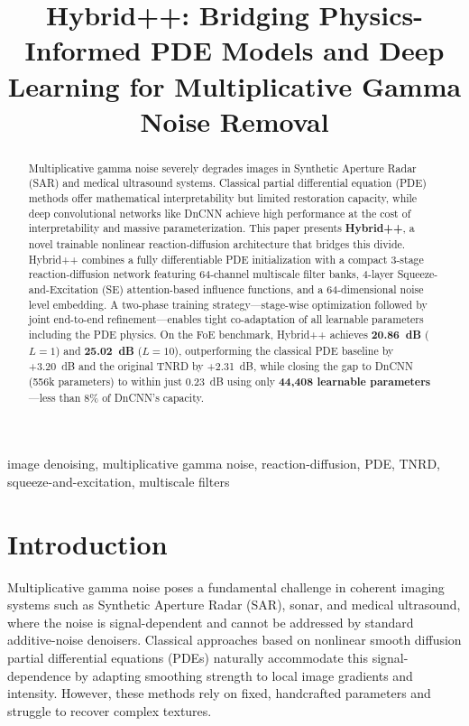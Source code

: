 \documentclass[conference]{IEEEtran}
\title{Hybrid++: Bridging Physics-Informed PDE Models and Deep Learning for Multiplicative Gamma Noise Removal}
\author{
\IEEEauthorblockN{Mahipal Jetta}
\IEEEauthorblockA{Mahindra University}
\and
\IEEEauthorblockN{Sujato Dutta}
\IEEEauthorblockA{Mahindra University}
}
\begin{document}
\maketitle

\begin{abstract}
Multiplicative gamma noise severely degrades images in Synthetic Aperture Radar (SAR) and medical ultrasound systems. Classical partial differential equation (PDE) methods offer mathematical interpretability but limited restoration capacity, while deep convolutional networks like DnCNN achieve high performance at the cost of interpretability and massive parameterization. This paper presents \textbf{Hybrid++}, a novel trainable nonlinear reaction-diffusion architecture that bridges this divide. Hybrid++ combines a fully differentiable PDE initialization with a compact 3-stage reaction-diffusion network featuring 64-channel multiscale filter banks, 4-layer Squeeze-and-Excitation (SE) attention-based influence functions, and a 64-dimensional noise level embedding. A two-phase training strategy---stage-wise optimization followed by joint end-to-end refinement---enables tight co-adaptation of all learnable parameters including the PDE physics. On the FoE benchmark, Hybrid++ achieves \textbf{20.86~dB} ($L{=}1$) and \textbf{25.02~dB} ($L{=}10$), outperforming the classical PDE baseline by +3.20~dB and the original TNRD by +2.31~dB, while closing the gap to DnCNN (556k parameters) to within just 0.23~dB using only \textbf{44,408 learnable parameters}---less than 8\% of DnCNN's capacity.
\end{abstract}

\begin{IEEEkeywords}
image denoising, multiplicative gamma noise, reaction-diffusion, PDE, TNRD, squeeze-and-excitation, multiscale filters
\end{IEEEkeywords}

\section{Introduction}
Multiplicative gamma noise poses a fundamental challenge in coherent imaging systems such as Synthetic Aperture Radar (SAR), sonar, and medical ultrasound, where the noise is signal-dependent and cannot be addressed by standard additive-noise denoisers. Classical approaches based on nonlinear smooth diffusion partial differential equations (PDEs) \cite{perona1990scale} naturally accommodate this signal-dependence by adapting smoothing strength to local image gradients and intensity. However, these methods rely on fixed, handcrafted parameters and struggle to recover complex textures.
\end{document}
